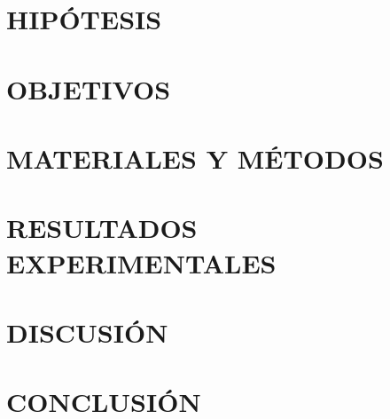 \documentclass[12pt,openany]{report}
\begin{document}
	\chapter{HIPÓTESIS} \label{cap:hipotesis}
	
	\chapter{OBJETIVOS} \label{cap:objetivos}
	
	\chapter{MATERIALES Y MÉTODOS} \label{cap3}
	
	\chapter{RESULTADOS EXPERIMENTALES} \label{cap:resultados}
	
	\chapter{DISCUSIÓN} \label{cap:discusion}
	
	\chapter{CONCLUSIÓN} \label{cap:conclusion}
	
	\clearpage
	\renewcommand{\bibname}{REFERENCIAS}
	\clearpage{}
	
	\setlength{\bibsep}{1em plus 0.5ex}
	\clearpage
	\appendix
	\renewcommand{\appendixname}{ANEXOS}
	\renewcommand{\appendixpagename}{ANEXOS}
	\renewcommand{\appendixtocname}{ANEXOS}
	\addappheadtotoc	
	
\end{document}
